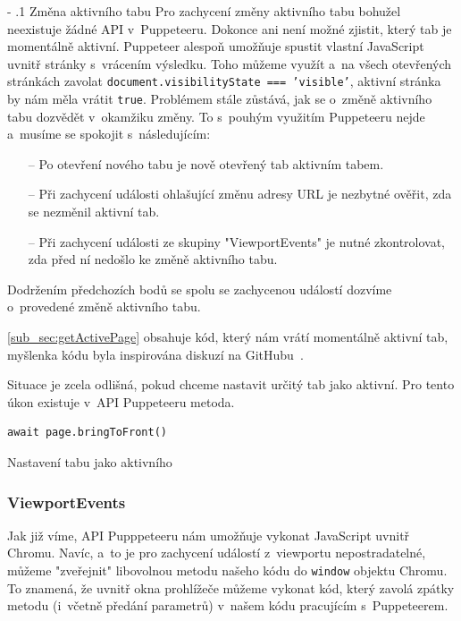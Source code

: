 \documentclass[12pt, a4paper, twoside]{article}
\makeatletter
\newcommand{\codefigureSpacing}{1.2}
\renewcommand\paragraph{%
	\@startsection{subparagraph}{5}{0mm}%
	{-\baselineskip}%
	{.1\baselineskip}%
	{\normalfont\normalsize\bfseries}}
\makeatother
\begin{document}
	\paragraph{Změna aktivního tabu}
	Pro zachycení změny aktivního tabu bohužel neexistuje žádné API v~Puppeteeru. Dokonce ani není možné zjistit, který tab je momentálně aktivní. Puppeteer alespoň umožňuje spustit vlastní JavaScript uvnitř stránky s~vrácením výsledku. Toho můžeme využít a~na všech otevřených stránkách zavolat \texttt{document.visibilityState === 'visible'}, aktivní stránka by nám měla vrátit \texttt{true}. Problémem stále zůstává, jak se o~změně aktivního tabu dozvědět v~okamžiku změny. To s~pouhým využitím Puppeteeru nejde a~musíme se spokojit s~následujícím:
	\begin{itemize}
		\item[--] Po otevření nového tabu je nově otevřený tab aktivním tabem.
		\item[--] Při zachycení události ohlašující změnu adresy URL je nezbytné ověřit, zda se nezměnil aktivní tab.
		\item[--] Při zachycení události ze skupiny "ViewportEvents" je nutné zkontrolovat, zda před ní nedošlo ke změně aktivního tabu.
	\end{itemize}
	Dodržením předchozích bodů se spolu se zachycenou událostí dozvíme o~provedené změně aktivního tabu. 
	
	\ref{sub_sec:getActivePage} obsahuje kód, který nám vrátí momentálně aktivní tab, myšlenka kódu byla inspirována diskuzí na GitHubu~\cite{getActivePagePupppeteer}.
	
	Situace je zcela odlišná, pokud chceme nastavit určitý tab jako aktivní. Pro tento úkon existuje v~API Puppeteeru metoda.
\begin{codefigure}[H]
	\renewcommand\baselinestretch{\codefigureSpacing}
	\begin{lstlisting}[style=MyJavaScript]
await page.bringToFront()
	\end{lstlisting}
	\caption{Nastavení tabu jako aktivního}
\end{codefigure}
	\subsubsection{ViewportEvents}
	Jak již víme, API Pupppeteeru nám umožňuje vykonat JavaScript uvnitř Chromu. Navíc, a~to je pro zachycení událostí z~viewportu nepostradatelné, můžeme "zveřejnit" libovolnou metodu našeho kódu do \texttt{window} objektu Chromu. To znamená, že uvnitř okna prohlížeče můžeme vykonat kód, který zavolá  zpátky metodu (i~včetně předání parametrů) v~našem kódu pracujícím s~Puppeteerem.
	
\end{document}
